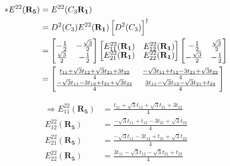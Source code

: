 \documentclass{article}
\begin{document}
\begin{align*}
    \ast E^{22}(\mathbf{R_5}) & = E^{22}(C_3\mathbf{ R_1})                                                                                                       \\
                              & = D^2(C_3)  E^{22}(\mathbf{R_1}) \left[ D^2(C_3) \right]^\dagger                                                                 \\
                              & =
    \begin{bmatrix}
        \renewcommand{\arraystretch}{0.72}
        -\frac{1}{2}       & -\frac{\sqrt{3}}{2} \\
        \frac{\sqrt{3}}{2} & -\frac{1}{2}
    \end{bmatrix}
    \begin{bmatrix}
        E_{11}^{22}(\mathbf{R_1}) & E_{12}^{22}(\mathbf{R_1}) \\
        E_{21}^{22}(\mathbf{R_1}) & E_{22}^{22}(\mathbf{R_1})
    \end{bmatrix}
    \begin{bmatrix}
        -\frac{1}{2}        & \frac{\sqrt{3}}{2} \\
        -\frac{\sqrt{3}}{2} & -\frac{1}{2}
    \end{bmatrix}                                                                                                     \\
                              & = \begin{bmatrix}
                                      \frac{t_{11} + \sqrt{3}t_{12} + \sqrt{3}t_{21} + 3t_{22}}{4}  & \frac{-\sqrt{3}t_{11} + t_{12} - 3 t_{21} + \sqrt{3}t_{22}}{4} \\
                                      \frac{-\sqrt{3}t_{11} - 3t_{12} + t_{21} + \sqrt{3}t_{22}}{4} & \frac{3t_{11} - \sqrt{3}t_{12} - \sqrt{3}t_{21} + t_{22}}{4}
                                  \end{bmatrix}
\end{align*}

\begin{align*}
    \Rightarrow E_{11}^{22}(\mathbf{R_5}) & =  \frac{t_{11} + \sqrt{3}t_{12} + \sqrt{3}t_{21} + 3t_{22}}{4}  \\
    E_{12}^{22}(\mathbf{R_5})             & = \frac{-\sqrt{3}t_{11} + t_{12} - 3 t_{21} + \sqrt{3}t_{22}}{4} \\
    E_{21}^{22}(\mathbf{R_5})             & = \frac{-\sqrt{3}t_{11} - 3t_{12} + t_{21} + \sqrt{3}t_{22}}{4}  \\
    E_{22}^{22}(\mathbf{R_5})             & = \frac{3t_{11} - \sqrt{3}t_{12} - \sqrt{3}t_{21} + t_{22}}{4}   \\
\end{align*}
\end{document}
